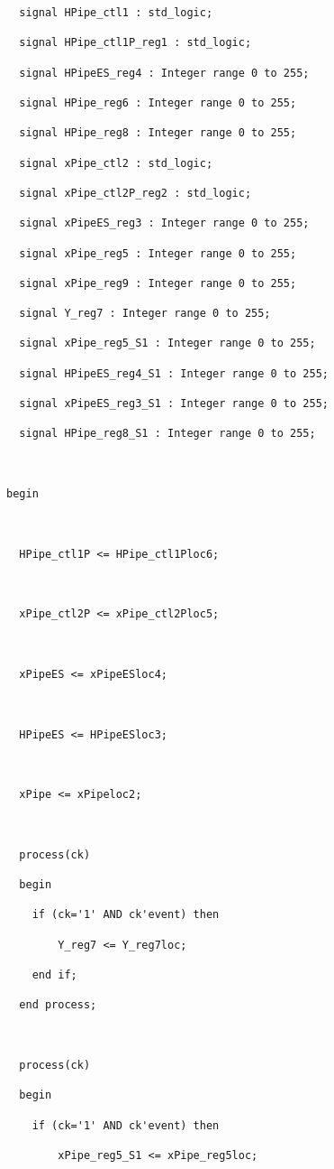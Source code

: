 \begin{verbatim}
  signal HPipe_ctl1 : std_logic;

  signal HPipe_ctl1P_reg1 : std_logic;

  signal HPipeES_reg4 : Integer range 0 to 255;

  signal HPipe_reg6 : Integer range 0 to 255;

  signal HPipe_reg8 : Integer range 0 to 255;

  signal xPipe_ctl2 : std_logic;

  signal xPipe_ctl2P_reg2 : std_logic;

  signal xPipeES_reg3 : Integer range 0 to 255;

  signal xPipe_reg5 : Integer range 0 to 255;

  signal xPipe_reg9 : Integer range 0 to 255;

  signal Y_reg7 : Integer range 0 to 255;

  signal xPipe_reg5_S1 : Integer range 0 to 255;

  signal HPipeES_reg4_S1 : Integer range 0 to 255;

  signal xPipeES_reg3_S1 : Integer range 0 to 255;

  signal HPipe_reg8_S1 : Integer range 0 to 255;



begin



  HPipe_ctl1P <= HPipe_ctl1Ploc6;



  xPipe_ctl2P <= xPipe_ctl2Ploc5;



  xPipeES <= xPipeESloc4;



  HPipeES <= HPipeESloc3;



  xPipe <= xPipeloc2;



  process(ck)

  begin

    if (ck='1' AND ck'event) then

        Y_reg7 <= Y_reg7loc;

    end if;

  end process;



  process(ck)

  begin

    if (ck='1' AND ck'event) then

        xPipe_reg5_S1 <= xPipe_reg5loc;


\end{verbatim}
